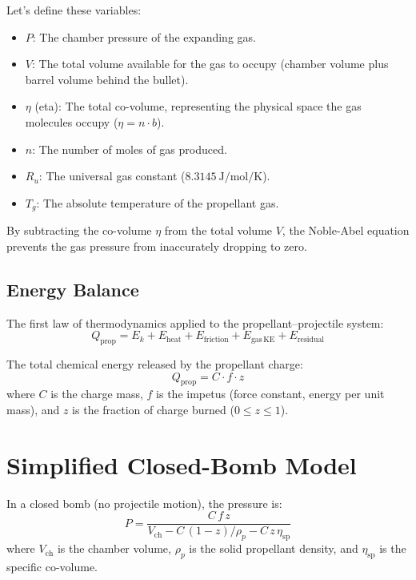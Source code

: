 \documentclass[11pt,twoside,openright]{report}
\begin{document}
Let's define these variables:
\begin{itemize}[noitemsep]
    \item $P$: The chamber pressure of the expanding gas.
    \item $V$: The total volume available for the gas to occupy (chamber volume plus barrel volume behind the bullet).
    \item $\eta$ (eta): The total co-volume, representing the physical space the gas molecules occupy ($\eta = n \cdot b$).
    \item $n$: The number of moles of gas produced.
    \item $R_u$: The universal gas constant ($\SI{8.3145}{\joule\per\mole\per\kelvin}$).
    \item $T_g$: The absolute temperature of the propellant gas.
\end{itemize}

By subtracting the co-volume $\eta$ from the total volume $V$, the Noble-Abel equation prevents the gas pressure from inaccurately dropping to zero.

\subsection{Energy Balance}

The first law of thermodynamics applied to the propellant--projectile system:
\begin{equation}
  Q_{\mathrm{prop}} = E_k + E_{\mathrm{heat}} + E_{\mathrm{friction}} + E_{\mathrm{gas\,KE}} + E_{\mathrm{residual}}
  \label{eq:energy_balance}
\end{equation}

The total chemical energy released by the propellant charge:
\begin{equation}
  Q_{\mathrm{prop}} = C \cdot f \cdot z
  \label{eq:Q_prop}
\end{equation}
where $C$ is the charge mass, $f$ is the impetus (force constant, energy per unit mass), and $z$ is the fraction of charge burned ($0 \le z \le 1$).

\section{Simplified Closed-Bomb Model}

In a closed bomb (no projectile motion), the pressure is:
\begin{equation}
  P = \frac{C\,f\,z}{V_{\mathrm{ch}} - C\,(1-z)/\rho_p - C\,z\,\eta_{\mathrm{sp}}}
  \label{eq:closed_bomb}
\end{equation}
where $V_{\mathrm{ch}}$ is the chamber volume, $\rho_p$ is the solid propellant density, and $\eta_{\mathrm{sp}}$ is the specific co-volume.
\end{document}
